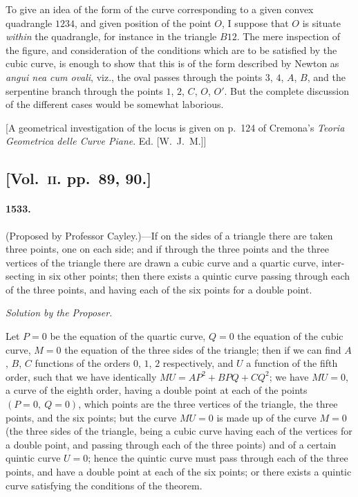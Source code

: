 \documentclass[11pt,a4paper]{article}
\begin{document}
To give an idea of the form of the curve corresponding to a given convex
quadrangle $1234$, and given position of the point $O$, I suppose that $O$ is situate
\textit{within} the quadrangle, for instance in the triangle $B12$. The mere inspection of the
figure, and consideration of the conditions which are to be satisfied by the cubic curve,
is enough to show that this is of the form described by Newton as \textit{angui\kern0pt nea cum
ovali}, viz., the oval passes through the points $3$, $4$, $A$, $B$, and the serpentine branch
through the points $1$, $2$, $C$, $O$, $O'$. But the complete discussion of the different cases
would be somewhat laborious.

[A geometrical investigation of the locus is given on p.~124 of Cremona's \textit{Teoria
Geometrica delle Curve Piane}. Ed. [W.~J.~M.]]


\subsection*{[Vol.~\textsc{ii}. pp.\ 89, 90.]}

\paragraph*{1533.} (Proposed by Professor Cayley.)---If on the sides of a triangle there are
taken three points, one on each side; and if through the three points and the three
vertices of the triangle there are drawn a cubic curve and a quartic curve, inter-
secting in six other points; then there exists a quintic curve passing through each
of the three points, and having each of the six points for a double point.

\begin{center}
\textit{Solution by the Proposer.}
\end{center}

Let $P=0$ be the equation of the quartic curve, $Q=0$ the equation of the cubic
curve, $M=0$ the equation of the three sides of the triangle; then if we can find
$A$, $B$, $C$ functions of the orders $0$, $1$, $2$ respectively, and $U$ a function of the fifth
order, such that we have identically $MU = AP^2 + BPQ + CQ^2$; we have $MU=0$, a curve
of the eighth order, having a double point at each of the points $(P=0,\ Q=0)$, which
points are the three vertices of the triangle, the three points, and the six points;
but the curve $MU=0$ is made up of the curve $M=0$ (the three sides of the
triangle, being a cubic curve having each of the vertices for a double point, and
passing through each of the three points) and of a certain quintic curve $U=0$;
hence the quintic curve must pass through each of the three points, and have a
double point at each of the six points; or there exists a quintic curve satisfying the
conditions of the theorem.
\end{document}
